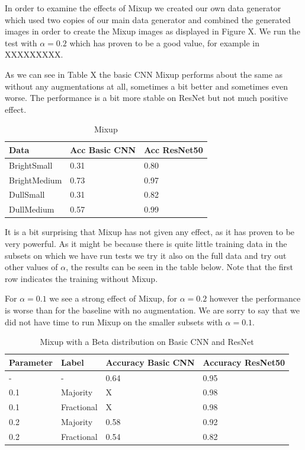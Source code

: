 \documentclass{article}
\begin{document}
In order to examine the effects of Mixup we created our own data generator which used two copies of our main data generator and combined the generated images in order to create the Mixup images as displayed in Figure X. We run the test with $\alpha=0.2$ which has proven to be a good value, for example in XXXXXXXXX.

As we can see in Table X the basic CNN Mixup performs about the same as without any augmentations at all, sometimes a bit better and sometimes even worse. The performance is a bit more stable on ResNet but not much positive effect.

\begin{table}[H]
	\caption{Mixup }
	\label{sample-table}
	\centering
	\begin{tabular}{lll}
		\toprule
		Data &  Acc Basic CNN & Acc ResNet50 \\
		\midrule
		
		BrightSmall  & 0.31 &     0.80 \\
		BrightMedium & 0.73 &     0.97 \\
		DullSmall    & 0.31 &     0.82 \\
		DullMedium   & 0.57 &     0.99 \\
		\bottomrule
	\end{tabular}
\end{table}

It is a bit surprising that Mixup has not given any effect, as it has proven to be very powerful. As it might be because there is quite little training data in the subsets on which we have run tests we try it also on the full data and try out other values of $\alpha$, the results can be seen in the table below. Note that the first row indicates the training without Mixup.

For $\alpha=0.1$ we see a strong effect of Mixup, for $\alpha=0.2$ however the performance is worse than for the baseline with no augmentation. We are sorry to say that we did not have time to run Mixup on the smaller subsets with $\alpha=0.1$. 

\begin{table}[H]
	\caption{Mixup with a Beta distribution on Basic CNN and ResNet}
	\label{sample-table}
	\centering
	\begin{tabular}{llll}
		\toprule
		Parameter & Label & Accuracy Basic CNN & Accuracy ResNet50 \\
		\midrule
		-   & -        & 0.64   & 0.95 \\
		0.1 & Majority & X       & 0.98 \\
		0.1 & Fractional & X     & 0.98  \\ 
		0.2 & Majority & 0.58   & 0.92 \\
		0.2 & Fractional & 0.54 & 0.82 \\ 
		
		\bottomrule
	\end{tabular}
\end{table}
\end{document}
